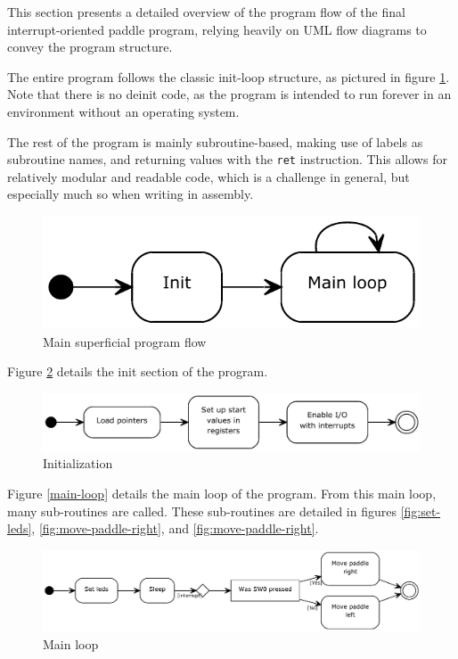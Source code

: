 This section presents a detailed overview of the program flow of the final interrupt-oriented paddle program, relying heavily on UML flow diagrams to convey the program structure.

The entire program follows the classic init-loop structure, as pictured in figure \ref{fig:main-program-flow}. Note that there is no deinit code, as the program is intended to run forever in an environment without an operating system.

The rest of the program is mainly subroutine-based, making use of labels as subroutine names, and returning values with the \texttt{ret} instruction. This allows for relatively modular and readable code, which is a challenge in general, but especially much so when writing in assembly.

\begin{figure}
\includegraphics[width = \textwidth]{description-and-methodology/program-flow/main-program-flow.pdf}
\caption{Main superficial program flow}
\label{fig:main-program-flow}
\end{figure}

Figure \ref{fig:init} details the init section of the program.

\begin{figure}
\includegraphics[width = \textwidth]{description-and-methodology/program-flow/init.pdf}
\caption{Initialization}
\label{fig:init}
\end{figure}

Figure \ref{main-loop} details the main loop of the program. From this main loop, many sub-routines are called. These sub-routines are detailed in figures \ref{fig:set-leds}, \ref{fig:move-paddle-right}, and \ref{fig:move-paddle-right}.

\begin{figure}
\includegraphics[width = \textwidth]{description-and-methodology/program-flow/main-loop.pdf}
\caption{Main loop}
\label{fig:main-loop}
\end{figure}

